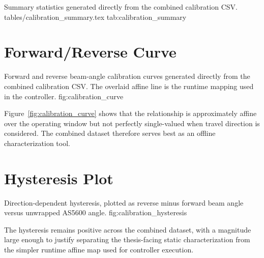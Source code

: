 \ReportTableFromFile
  {Summary statistics generated directly from the combined calibration CSV.}
  {tables/calibration_summary.tex}
  {tab:calibration_summary}

\section{Forward/Reverse Curve}

  {Forward and reverse beam-angle calibration curves generated directly from the
  combined calibration CSV. The overlaid affine line is the runtime mapping used in the
  controller.}
  {fig:calibration_curve}

Figure~\ref{fig:calibration_curve} shows that the relationship is approximately affine
over the operating window but not perfectly single-valued when travel direction is
considered. The combined dataset therefore serves best as an offline characterization
tool.

\section{Hysteresis Plot}

  {Direction-dependent hysteresis, plotted as reverse minus forward beam angle versus
  unwrapped AS5600 angle.}
  {fig:calibration_hysteresis}

The hysteresis remains positive across the combined dataset, with a magnitude large
enough to justify separating the thesis-facing static characterization from the simpler
runtime affine map used for controller execution.
